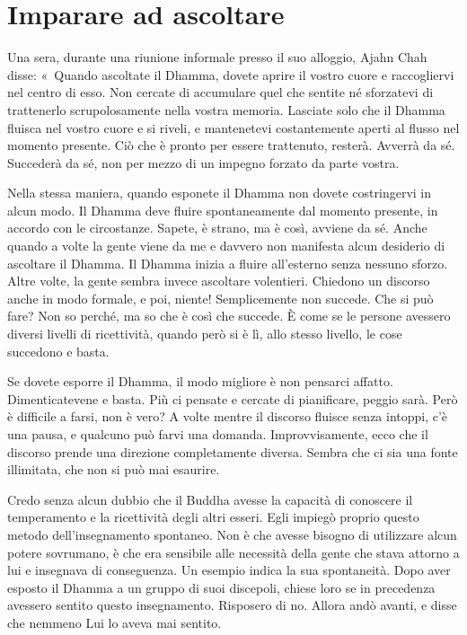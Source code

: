 \chapter{Imparare ad ascoltare}

Una sera, durante una riunione informale presso il suo alloggio, Ajahn
Chah disse: «~Quando ascoltate il Dhamma, dovete aprire il vostro cuore
e raccogliervi nel centro di esso. Non cercate di accumulare quel che
sentite né sforzatevi di trattenerlo scrupolosamente nella vostra
memoria. Lasciate solo che il Dhamma fluisca nel vostro cuore e si
riveli, e mantenetevi costantemente aperti al flusso nel momento
presente. Ciò che è pronto per essere trattenuto, resterà. Avverrà da
sé. Succederà da sé, non per mezzo di un impegno forzato da parte
vostra.

Nella stessa maniera, quando esponete il Dhamma non dovete costringervi
in alcun modo. Il Dhamma deve fluire spontaneamente dal momento
presente, in accordo con le circostanze. Sapete, è strano, ma è così,
avviene da sé. Anche quando a volte la gente viene da me e davvero non
manifesta alcun desiderio di ascoltare il Dhamma. Il Dhamma inizia a
fluire all'esterno senza nessuno sforzo. Altre volte, la gente sembra
invece ascoltare volentieri. Chiedono un discorso anche in modo formale,
e poi, niente! Semplicemente non succede. Che si può fare? Non so
perché, ma so che è così che succede. È come se le persone avessero
diversi livelli di ricettività, quando però si è lì, allo stesso
livello, le cose succedono e basta.

Se dovete esporre il Dhamma, il modo migliore è non pensarci affatto.
Dimenticatevene e basta. Più ci pensate e cercate di pianificare, peggio
sarà. Però è difficile a farsi, non è vero? A volte mentre il discorso
fluisce senza intoppi, c'è una pausa, e qualcuno può farvi una domanda.
Improvvisamente, ecco che il discorso prende una direzione completamente
diversa. Sembra che ci sia una fonte illimitata, che non si può mai
esaurire.

Credo senza alcun dubbio che il Buddha avesse la capacità di conoscere
il temperamento e la ricettività degli altri esseri. Egli impiegò
proprio questo metodo dell'insegnamento spontaneo. Non è che avesse
bisogno di utilizzare alcun potere sovrumano, è che era sensibile alle
necessità della gente che stava attorno a lui e insegnava di
conseguenza. Un esempio indica la sua spontaneità. Dopo aver esposto il
Dhamma a un gruppo di suoi discepoli, chiese loro se in precedenza
avessero sentito questo insegnamento. Risposero di no. Allora andò
avanti, e disse che nemmeno Lui lo aveva mai sentito.

